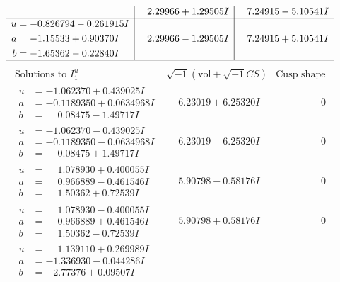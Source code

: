 \documentclass[1p]{elsarticle_modified}
\theoremstyle{definition}
\newcommand{\I}{\sqrt{-1}}
\begin{document}
$$\begin{array}{c|c|c}
 & \phantom{-}2.29966 + 1.29505 I & \phantom{-}7.24915 - 5.10541 I \\ \hline\begin{aligned}
u &= -0.826794 - 0.261915 I \\
a &= -1.15533 + 0.90370 I \\
b &= -1.65362 - 0.22840 I\end{aligned}
 & \phantom{-}2.29966 - 1.29505 I & \phantom{-}7.24915 + 5.10541 I\\
 \hline 
 \end{array}$$\newpage$$\begin{array}{c|c|c}  
\text{Solutions to }I^u_{1}& \I (\text{vol} + \sqrt{-1}CS) & \text{Cusp shape}\\
 \hline 
\begin{aligned}
u &= -1.062370 + 0.439025 I \\
a &= -0.1189350 + 0.0634968 I \\
b &= \phantom{-}0.08475 - 1.49717 I\end{aligned}
 & \phantom{-}6.23019 + 6.25320 I & \phantom{-0.000000 } 0 \\ \hline\begin{aligned}
u &= -1.062370 - 0.439025 I \\
a &= -0.1189350 - 0.0634968 I \\
b &= \phantom{-}0.08475 + 1.49717 I\end{aligned}
 & \phantom{-}6.23019 - 6.25320 I & \phantom{-0.000000 } 0 \\ \hline\begin{aligned}
u &= \phantom{-}1.078930 + 0.400055 I \\
a &= \phantom{-}0.966889 - 0.461546 I \\
b &= \phantom{-}1.50362 + 0.72539 I\end{aligned}
 & \phantom{-}5.90798 - 0.58176 I & \phantom{-0.000000 } 0 \\ \hline\begin{aligned}
u &= \phantom{-}1.078930 - 0.400055 I \\
a &= \phantom{-}0.966889 + 0.461546 I \\
b &= \phantom{-}1.50362 - 0.72539 I\end{aligned}
 & \phantom{-}5.90798 + 0.58176 I & \phantom{-0.000000 } 0 \\ \hline\begin{aligned}
u &= \phantom{-}1.139110 + 0.269989 I \\
a &= -1.336930 - 0.044286 I \\
b &= -2.77376 + 0.09507 I\end{aligned}

\end{array}$$
\end{document}
